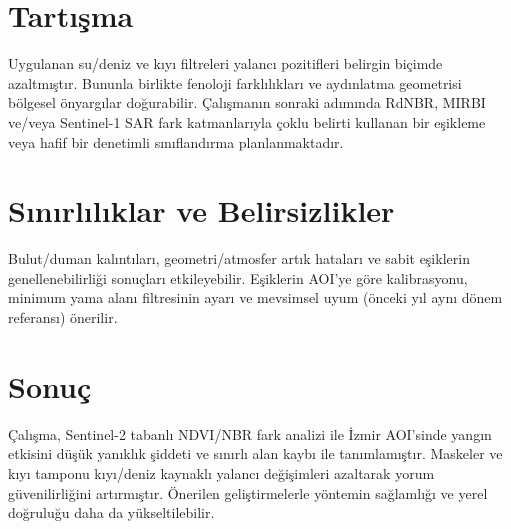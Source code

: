 \documentclass[11pt,a4paper]{article}
\begin{document}
\section{Tartışma}
Uygulanan su/deniz ve kıyı filtreleri yalancı pozitifleri belirgin biçimde azaltmıştır. Bununla birlikte fenoloji farklılıkları ve aydınlatma geometrisi bölgesel önyargılar doğurabilir. Çalışmanın sonraki adımında RdNBR, MIRBI ve/veya Sentinel-1 SAR fark katmanlarıyla çoklu belirti kullanan bir eşikleme veya hafif bir denetimli sınıflandırma planlanmaktadır.

\section{Sınırlılıklar ve Belirsizlikler}
Bulut/duman kalıntıları, geometri/atmosfer artık hataları ve sabit eşiklerin genellenebilirliği sonuçları etkileyebilir. Eşiklerin AOI'ye göre kalibrasyonu, minimum yama alanı filtresinin ayarı ve mevsimsel uyum (önceki yıl aynı dönem referansı) önerilir.

\section{Sonuç}
Çalışma, Sentinel-2 tabanlı NDVI/NBR fark analizi ile İzmir AOI'sinde yangın etkisini düşük yanıklık şiddeti ve sınırlı alan kaybı ile tanımlamıştır. Maskeler ve kıyı tamponu kıyı/deniz kaynaklı yalancı değişimleri azaltarak yorum güvenilirliğini artırmıştır. Önerilen geliştirmelerle yöntemin sağlamlığı ve yerel doğruluğu daha da yükseltilebilir.
\end{document}
